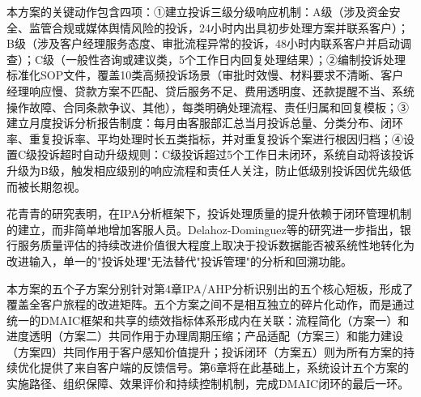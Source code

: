 本方案的关键动作包含四项：①建立投诉三级分级响应机制：A级（涉及资金安全、监管合规或媒体舆情风险的投诉，24小时内出具初步处理方案并联系客户）；B级（涉及客户经理服务态度、审批流程异常的投诉，48小时内联系客户并启动调查）；C级（一般性咨询或建议类，5个工作日内回复处理结果）；②编制投诉处理标准化SOP文件，覆盖10类高频投诉场景（审批时效慢、材料要求不清晰、客户经理响应慢、贷款方案不匹配、贷后服务不足、费用透明度、还款提醒不当、系统操作故障、合同条款争议、其他），每类明确处理流程、责任归属和回复模板；③建立月度投诉分析报告制度：每月由客服部汇总当月投诉总量、分类分布、闭环率、重复投诉率、平均处理时长五类指标，并对重复投诉个案进行根因归档；④设置C级投诉超时自动升级规则：C级投诉超过5个工作日未闭环，系统自动将该投诉升级为B级，触发相应级别的响应流程和责任人关注，防止低级别投诉因优先级低而被长期忽视。\par

花青青的研究表明，在IPA分析框架下，投诉处理质量的提升依赖于闭环管理机制的建立，而非简单地增加客服人员\cite{ref15}。Delahoz-Dominguez等的研究进一步指出，银行服务质量评估的持续改进价值很大程度上取决于投诉数据能否被系统性地转化为改进输入，单一的"投诉处理"无法替代"投诉管理"的分析和回溯功能\cite{ref50}。\par

本方案的五个子方案分别针对第4章IPA/AHP分析识别出的五个核心短板，形成了覆盖全客户旅程的改进矩阵。五个方案之间不是相互独立的碎片化动作，而是通过统一的DMAIC框架和共享的绩效指标体系形成内在关联：流程简化（方案一）和进度透明（方案二）共同作用于办理周期压缩；产品适配（方案三）和能力建设（方案四）共同作用于客户感知价值提升；投诉闭环（方案五）则为所有方案的持续优化提供了来自客户端的反馈信号。第6章将在此基础上，系统设计五个方案的实施路径、组织保障、效果评价和持续控制机制，完成DMAIC闭环的最后一环。\par
